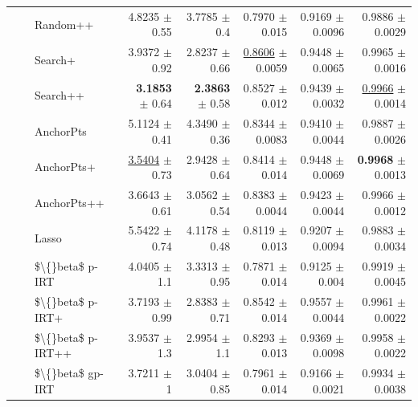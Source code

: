 \begin{longtable}{llp{}rrrrr}
 &  & Random++ & 4.8235 {\scriptsize $\pm$ 0.55} & 3.7785 {\scriptsize $\pm$ 0.4} & 0.7970 {\scriptsize $\pm$ 0.015} & 0.9169 {\scriptsize $\pm$ 0.0096} & 0.9886 {\scriptsize $\pm$ 0.0029} \\
 &  & Search+ & 3.9372 {\scriptsize $\pm$ 0.92} & 2.8237 {\scriptsize $\pm$ 0.66} & \underline{0.8606} {\scriptsize $\pm$ 0.0059} & 0.9448 {\scriptsize $\pm$ 0.0065} & 0.9965 {\scriptsize $\pm$ 0.0016} \\
 &  & Search++ & \textbf{3.1853} {\scriptsize $\pm$ 0.64} & \textbf{2.3863} {\scriptsize $\pm$ 0.58} & 0.8527 {\scriptsize $\pm$ 0.012} & 0.9439 {\scriptsize $\pm$ 0.0032} & \underline{0.9966} {\scriptsize $\pm$ 0.0014} \\
 &  & AnchorPts & 5.1124 {\scriptsize $\pm$ 0.41} & 4.3490 {\scriptsize $\pm$ 0.36} & 0.8344 {\scriptsize $\pm$ 0.0083} & 0.9410 {\scriptsize $\pm$ 0.0044} & 0.9887 {\scriptsize $\pm$ 0.0026} \\
 &  & AnchorPts+ & \underline{3.5404} {\scriptsize $\pm$ 0.73} & 2.9428 {\scriptsize $\pm$ 0.64} & 0.8414 {\scriptsize $\pm$ 0.014} & 0.9448 {\scriptsize $\pm$ 0.0069} & \textbf{0.9968} {\scriptsize $\pm$ 0.0013} \\
 &  & AnchorPts++ & 3.6643 {\scriptsize $\pm$ 0.61} & 3.0562 {\scriptsize $\pm$ 0.54} & 0.8383 {\scriptsize $\pm$ 0.0044} & 0.9423 {\scriptsize $\pm$ 0.0044} & 0.9966 {\scriptsize $\pm$ 0.0012} \\
 &  & Lasso & 5.5422 {\scriptsize $\pm$ 0.74} & 4.1178 {\scriptsize $\pm$ 0.48} & 0.8119 {\scriptsize $\pm$ 0.013} & 0.9207 {\scriptsize $\pm$ 0.0094} & 0.9883 {\scriptsize $\pm$ 0.0034} \\
 &  & \$\textbackslash\{\}beta\$ p-IRT & 4.0405 {\scriptsize $\pm$ 1.1} & 3.3313 {\scriptsize $\pm$ 0.95} & 0.7871 {\scriptsize $\pm$ 0.014} & 0.9125 {\scriptsize $\pm$ 0.004} & 0.9919 {\scriptsize $\pm$ 0.0045} \\
 &  & \$\textbackslash\{\}beta\$ p-IRT+ & 3.7193 {\scriptsize $\pm$ 0.99} & 2.8383 {\scriptsize $\pm$ 0.71} & 0.8542 {\scriptsize $\pm$ 0.014} & 0.9557 {\scriptsize $\pm$ 0.0044} & 0.9961 {\scriptsize $\pm$ 0.0022} \\
 &  & \$\textbackslash\{\}beta\$ p-IRT++ & 3.9537 {\scriptsize $\pm$ 1.3} & 2.9954 {\scriptsize $\pm$ 1.1} & 0.8293 {\scriptsize $\pm$ 0.013} & 0.9369 {\scriptsize $\pm$ 0.0098} & 0.9958 {\scriptsize $\pm$ 0.0022} \\
 &  & \$\textbackslash\{\}beta\$ gp-IRT & 3.7211 {\scriptsize $\pm$ 1} & 3.0404 {\scriptsize $\pm$ 0.85} & 0.7961 {\scriptsize $\pm$ 0.014} & 0.9166 {\scriptsize $\pm$ 0.0021} & 0.9934 {\scriptsize $\pm$ 0.0038} \\

\end{longtable}
